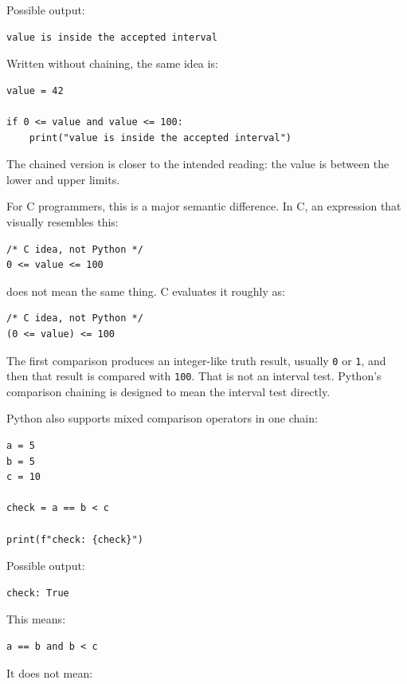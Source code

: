 Possible output:

\begin{verbatim}
value is inside the accepted interval
\end{verbatim}

Written without chaining, the same idea is:

\begin{verbatim}
value = 42

if 0 <= value and value <= 100:
    print("value is inside the accepted interval")
\end{verbatim}

The chained version is closer to the intended reading: the value is between the lower and upper limits.

For C programmers, this is a major semantic difference. In C, an expression that visually resembles this:

\begin{verbatim}
/* C idea, not Python */
0 <= value <= 100
\end{verbatim}

does not mean the same thing. C evaluates it roughly as:

\begin{verbatim}
/* C idea, not Python */
(0 <= value) <= 100
\end{verbatim}

The first comparison produces an integer-like truth result, usually \texttt{0} or \texttt{1}, and then that result is compared with \texttt{100}. That is not an interval test. Python's comparison chaining is designed to mean the interval test directly.

Python also supports mixed comparison operators in one chain:

\begin{verbatim}
a = 5
b = 5
c = 10

check = a == b < c

print(f"check: {check}")
\end{verbatim}

Possible output:

\begin{verbatim}
check: True
\end{verbatim}

This means:

\begin{verbatim}
a == b and b < c
\end{verbatim}

It does not mean:

